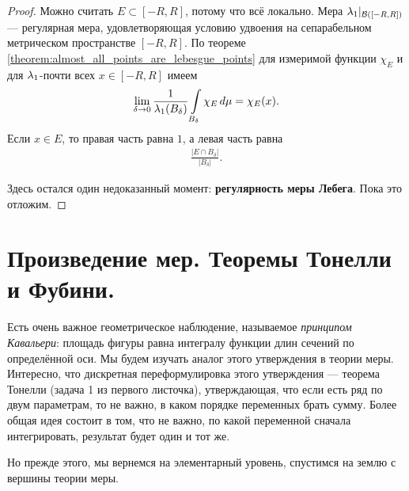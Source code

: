 \begin{proof}
 Можно считать $E \subset [-R, R]$, потому что всё локально. Мера $\lambda_{1} \rvert_{\mathcal{B}([-R, R])}$  --- регулярная мера, удовлетворяющая условию удвоения на сепарабельном метрическом пространстве $[-R,R]$. По теореме \ref{theorem:almost_all_points_are_lebesgue_points} для измеримой функции $\chi_E$ и для $\lambda_{1}$-почти всех $x \in [-R, R]$  имеем \begin{align*}
  \lim_{\delta \to 0} \frac{1}{\lambda_{1}(B_{\delta})} \int\limits_{B_{\delta}} \chi_E \, d\mu  = \chi_E(x)
 .\end{align*} Если $x \in E$, то правая часть равна $1$, а левая часть равна \begin{align*}
  \frac{\left| E \cap B_{\delta} \right|}{\left| B_{\delta} \right|}
 .\end{align*}

 Здесь остался один недоказанный момент: \textbf{регулярность меры Лебега}. Пока это отложим.
\end{proof}

\section{Произведение мер. Теоремы Тонелли и Фубини.}

Есть очень важное геометрическое наблюдение, называемое \textit{принципом Кавальери}: площадь фигуры равна интегралу функции длин сечений по определённой оси. Мы будем изучать аналог этого утверждения в теории меры. Интересно, что дискретная переформулировка этого утверждения --- теорема Тонелли (задача 1 из первого листочка), утверждающая, что если есть ряд по двум параметрам, то не важно, в каком порядке переменных брать сумму. Более общая идея состоит в том, что не важно, по какой переменной сначала интегрировать, результат будет один и тот же.

Но прежде этого, мы вернемся на элементарный уровень, спустимся на землю с вершины теории меры.

